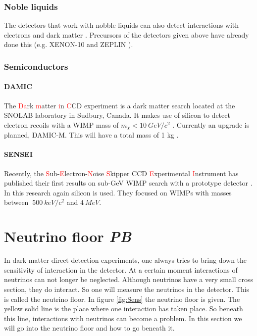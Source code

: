 \documentclass{article}
\begin{document}
\subsubsection{Noble liquids}
The detectors that work with nobble liquids can also detect interactions with electrons and dark matter \cite{Essig:2011nj}. Precursors of the detectors given above have already done this (e.g. XENON-10 \cite{Angle:2011th} and ZEPLIN \cite{Edwards:2007nj}).
\subsubsection{Semiconductors}
\paragraph{DAMIC}
The \textcolor{red}{Da}rk \textcolor{red}{m}atter \textcolor{red}{i}n \textcolor{red}{C}CD experiment is a dark matter search located at the SNOLAB laboratory in Sudbury, Canada. It makes use of silicon to detect electron recoils with a WIMP mass of $m_\chi < 10\ GeV/c^2$ \cite{Aguilar-Arevalo:2016ndq}. Currently an upgrade is planned, DAMIC-M. This will have a total mass of 1 kg \cite{Settimo:2018qcm}.
\paragraph{SENSEI}
Recently, the \textcolor{red}{S}ub-\textcolor{red}{E}lectron-\textcolor{red}{N}oise \textcolor{red}{S}kipper CCD \textcolor{red}{E}xperimental \textcolor{red}{I}nstrument has published their first results on sub-GeV WIMP search with a prototype detector \cite{Crisler:2018gci}. In this research again silicon is used. They focused on WIMPs with masses between $~500\ keV/c^2$ and $4\ MeV$.
 

\FloatBarrier
\newpage
\section{Neutrino floor \small{\textit{PB}}}
\label{sec:floor}
In dark matter direct detection experiments, one always tries to bring down the sensitivity of interaction in the detector. At a certain moment interactions of neutrinos can not longer be neglected. Although neutrinos have a very small cross section, they do interact. So one will measure the neutrinos in the detector. This is called the neutrino floor. In figure \ref{fig:Sens} the neutrino floor is given. The yellow solid line is the place where one interaction has taken place. So beneath this line, interactions with neutrinos can become a problem. In this section we will go into the neutrino floor and how to go beneath it.
\end{document}
